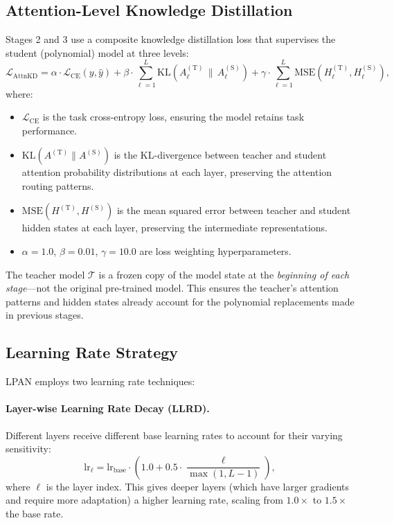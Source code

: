 \subsection{Attention-Level Knowledge Distillation}
\label{sec:attn_kd}

Stages 2 and 3 use a composite knowledge distillation loss that supervises the student (polynomial) model at three levels:
\begin{equation}
    \mathcal{L}_{\mathrm{AttnKD}} = \alpha \cdot \mathcal{L}_{\mathrm{CE}}(y, \hat{y}) + \beta \cdot \sum_{\ell=1}^{L} \mathrm{KL}\!\left(A_\ell^{(\mathrm{T})} \,\|\, A_\ell^{(\mathrm{S})}\right) + \gamma \cdot \sum_{\ell=1}^{L} \mathrm{MSE}\!\left(H_\ell^{(\mathrm{T})}, H_\ell^{(\mathrm{S})}\right),
    \label{eq:attn_kd}
\end{equation}
where:
\begin{itemize}
    \item $\mathcal{L}_{\mathrm{CE}}$ is the task cross-entropy loss, ensuring the model retains task performance.
    \item $\mathrm{KL}(A^{(\mathrm{T})} \| A^{(\mathrm{S})})$ is the KL-divergence between teacher and student attention probability distributions at each layer, preserving the attention routing patterns.
    \item $\mathrm{MSE}(H^{(\mathrm{T})}, H^{(\mathrm{S})})$ is the mean squared error between teacher and student hidden states at each layer, preserving the intermediate representations.
    \item $\alpha = 1.0$, $\beta = 0.01$, $\gamma = 10.0$ are loss weighting hyperparameters.
\end{itemize}

The teacher model $\mathcal{T}$ is a frozen copy of the model state at the \emph{beginning of each stage}---not the original pre-trained model. This ensures the teacher's attention patterns and hidden states already account for the polynomial replacements made in previous stages.

\subsection{Learning Rate Strategy}
\label{sec:lr_strategy}

LPAN employs two learning rate techniques:

\paragraph{Layer-wise Learning Rate Decay (LLRD).} Different layers receive different base learning rates to account for their varying sensitivity:
\begin{equation}
    \mathrm{lr}_\ell = \mathrm{lr}_{\mathrm{base}} \cdot \left(1.0 + 0.5 \cdot \frac{\ell}{\max(1, L-1)}\right),
    \label{eq:llrd}
\end{equation}
where $\ell$ is the layer index. This gives deeper layers (which have larger gradients and require more adaptation) a higher learning rate, scaling from $1.0\times$ to $1.5\times$ the base rate.

